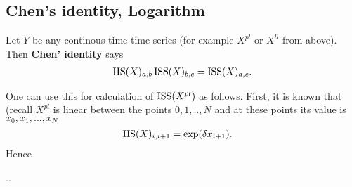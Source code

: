 \documentclass{scrartcl}
\theoremstyle{plain}
\theoremstyle{definition}
\begin{document}
\subsection{Chen's identity, Logarithm}

Let $Y$ be any continous-time time-series (for example $X^{pl}$ or $X^{ll}$ from above).
Then \textbf{Chen' identity} says
\begin{align*}
  \operatorname{IIS}(X)_{a,b} \operatorname{ISS}(X)_{b,c} = \operatorname{ISS}(X)_{a,c}.
\end{align*}

One can use this for calculation of $\operatorname{ISS}(X^{pl})$ as follows.
First, it is known that (recall $X^{pl}$ is linear between the points $0,1,..,N$ and at these points its value is $x_0, x_1, \dots, x_N$
\begin{align*}
  \operatorname{IIS}(X)_{i,i+1}
  &=
  \exp( \delta x_{i+1} ).
\end{align*}
Hence

..



%  
\end{document}

